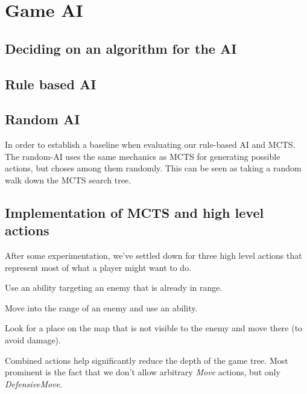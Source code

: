 \chapter{Game AI}

\section{Deciding on an algorithm for the AI}

\section{Rule based AI}

\section{Random AI}

In order to establish a baseline when evaluating our rule-based AI and MCTS.
The random-AI uses the same mechanics as MCTS for generating possible actions,
but choses among them randomly. This can be seen as taking a random walk down
the MCTS search tree.

\section{Implementation of MCTS and high level actions}

After some experimentation, we've settled down for three high level actions
that represent most of what a player might want to do.

\begin{description}[align=right,labelwidth=3cm]
\item [AbilityUse] Use an ability targeting an enemy that is already in range.
\item [AttackMove] Move into the range of an enemy and use an ability.
\item [DefensiveMove] Look for a place on the map that is not visible to the enemy and move there (to avoid damage).
\end{description}

Combined actions help significantly reduce the depth of the game tree. Most
prominent is the fact that we don't allow arbitrary \emph{Move} actions, but
only \emph{DefensiveMove}.